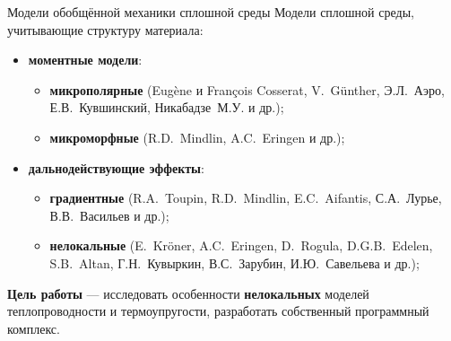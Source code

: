 \begin{frame}{Модели обобщённой механики сплошной среды}
	Модели сплошной среды, учитывающие структуру материала:
	\begin{itemize}
		\item \textbf{моментные модели}:
		\begin{itemize}
			\justifying
			\item \textbf{микрополярные} (Eugène и François Cosserat, V.~G{\"u}nther, Э.Л.~Аэро, Е.В.~Кувшинский, Никабадзе~М.У. и др.);
			\item \textbf{микроморфные} (R.D.~Mindlin, A.C.~Eringen и др.);
		\end{itemize}
		\item \textbf{дальнодействующие эффекты}:
		\begin{itemize}
			\justifying
			\item \textbf{градиентные} (R.A.~Toupin, R.D.~Mindlin, E.C.~Aifantis, С.А.~Лурье, В.В.~Васильев и др.);
			\item \textbf{нелокальные} (E.~Kr{\"o}ner, A.C.~Eringen, D.~Rogula, D.G.B.~Edelen, S.B.~Altan, Г.Н.~Кувыркин, В.С.~Зарубин, И.Ю.~Савельева и др.);
		\end{itemize}
	\end{itemize}
	
	\justifying
	\bigskip
	\textbf{Цель работы} --- исследовать особенности \textbf{нелокальных} моделей теплопроводности и термоупругости, разработать собственный программный комплекс.
	

\end{frame}
